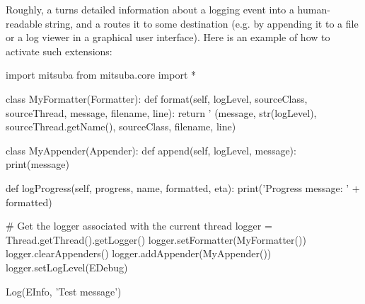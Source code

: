 Roughly, a  turns detailed
information about a logging event into a human-readable string, and a
 routes it to some destination (e.g. by appending it to
a file or a log viewer in a graphical user interface). Here is an example
of how to activate such extensions:
\begin{python}
import mitsuba
from mitsuba.core import *

class MyFormatter(Formatter):
	def format(self, logLevel, sourceClass, sourceThread, message, filename, line):
		return '%
				(message, str(logLevel), sourceThread.getName(), sourceClass,
				 filename, line)

class MyAppender(Appender):
	def append(self, logLevel, message):
		print(message)

	def logProgress(self, progress, name, formatted, eta):
		print('Progress message: ' + formatted)

# Get the logger associated with the current thread
logger = Thread.getThread().getLogger()
logger.setFormatter(MyFormatter())
logger.clearAppenders()
logger.addAppender(MyAppender())
logger.setLogLevel(EDebug)

Log(EInfo, 'Test message')
\end{python}
